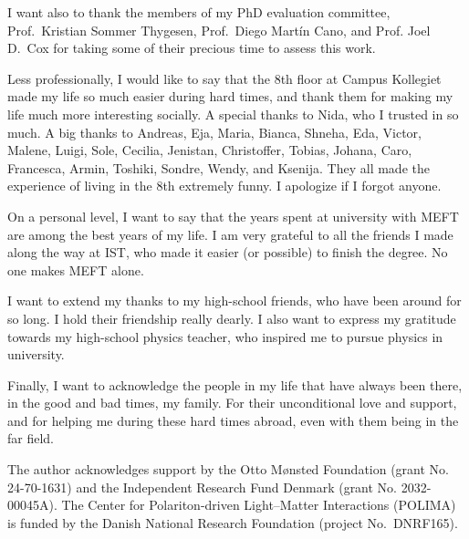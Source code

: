 \begin{ntacknowledgements}
I want also to thank the members of my PhD evaluation committee, Prof.~Kristian Sommer Thygesen, Prof.~Diego Martín Cano, and Prof. Joel D.~Cox for taking some of their precious time to assess this work.

Less professionally, I would like to say that the 8th floor at Campus Kollegiet made my life so much easier during hard times, and thank them for making my life much more interesting socially.
A special thanks to Nida, who I trusted in so much.
A big thanks to Andreas, Eja, Maria, Bianca, Shneha, Eda, Victor, Malene, Luigi, Sole, Cecilia, Jenistan, Christoffer, Tobias, Johana, Caro, Francesca, Armin, Toshiki, Sondre, Wendy, and Ksenija.
They all made the experience of living in the 8th extremely funny.
I apologize if I forgot anyone.

On a personal level, I want to say that the years spent at university with MEFT are among the best years of my life.
I am very grateful to all the friends I made along the way at IST, who made it easier (or possible) to finish the degree.
No one makes MEFT alone.

I want to extend my thanks to my high-school friends, who have been around for so long.
I hold their friendship really dearly.
I also want to express my gratitude towards my high-school physics teacher, who inspired me to pursue physics in university.

Finally, I want to acknowledge the people in my life that have always been there, in the good and bad times, my family.
For their unconditional love and support, and for helping me during these hard times abroad, even with them being in the far field.


The author acknowledges support by the Otto M{\o}nsted Foundation (grant No. 24-70-1631) and the Independent Research Fund Denmark (grant No. 2032-00045A).
%
The Center for Polariton-driven Light--Matter Interactions (POLIMA) is funded by the Danish National Research Foundation (project No.~DNRF165).


\end{ntacknowledgements}